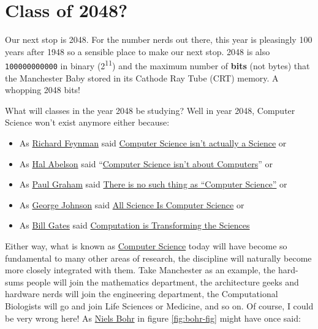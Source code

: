 \documentclass[
  12pt,
]{book}
\providecommand{\tightlist}{%
  \setlength{\itemsep}{0pt}\setlength{\parskip}{0pt}}
\begin{document}
\hypertarget{y2048}{%
\section{Class of 2048?}\label{y2048}}

Our next stop is 2048. For the number nerds out there, this year is pleasingly 100 years after 1948 so a sensible place to make our next stop. 2048 is also \texttt{100000000000} in binary (2\textsuperscript{11}) and the maximum number of \textbf{bits} (not bytes) that the Manchester Baby stored in its Cathode Ray Tube (CRT) memory. A whopping 2048 bits! \citep{kilburnphd}

What will classes in the year 2048 be studying? Well in year 2048, Computer Science won't exist anymore either because:

\begin{itemize}
\tightlist
\item
  As \href{https://en.wikipedia.org/wiki/Richard_Feynman}{Richard Feynman} said \href{https://web.archive.org/web/20071112020412/http://www.cs.man.ac.uk/~hulld/q2007-07-09.html}{Computer Science isn't actually a Science} or
\item
  As \href{https://en.wikipedia.org/wiki/Hal_Abelson}{Hal Abelson} said ``\href{http://groups.csail.mit.edu/mac/classes/6.001/abelson-sussman-lectures/}{Computer Science isn't about Computers}'' or
\item
  As \href{https://en.wikipedia.org/wiki/Paul_Graham_(programmer)}{Paul Graham} said \href{http://www.paulgraham.com/hp.html}{There is no such thing as ``Computer Science''} or
\item
  As \href{https://en.wikipedia.org/wiki/George_Johnson_\%28writer\%29}{George Johnson} said \href{https://www.nytimes.com/2001/03/25/weekinreview/the-world-in-silica-fertilization-all-science-is-computer-science.html}{All Science Is Computer Science} or
\item
  As \href{https://en.wikipedia.org/wiki/Bill_Gates}{Bill Gates} said \href{https://web.archive.org/web/20080221053710/https://www.microsoft.com/presspass/exec/billg/speeches/2005/11-15SuperComputing05.aspx}{Computation is Transforming the Sciences}
\end{itemize}

Either way, what is known as \href{https://en.wikipedia.org/wiki/Computer_science}{Computer Science} today will have become so fundamental to many other areas of research, the discipline will naturally become more closely integrated with them. Take Manchester as an example, the hard-sums people will join the mathematics department, the architecture geeks and hardware nerds will join the engineering department, the Computational Biologists will go and join Life Sciences or Medicine, and so on. Of course, I could be very wrong here! As \href{https://en.wikipedia.org/wiki/Niels_Bohr}{Niels Bohr} in figure \ref{fig:bohr-fig} might have once said:
\end{document}

